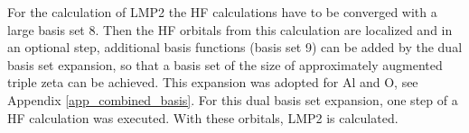 \documentclass[11pt,DIV=13,BCOR=5mm,a4paper,headinclude]{scrbook}
\begin{document}
For the calculation of LMP2 the HF calculations have to be converged with a large basis set 8.
Then the HF orbitals from this calculation are localized and in an optional step, additional basis functions (basis set 9) can be added by the dual basis set expansion\cite{Usvyat2010}, so that a basis set of the size of approximately augmented triple zeta can be achieved.
This expansion was adopted for Al and O, see Appendix \ref{app_combined_basis}.
For this dual basis set expansion, one step of a HF calculation was executed.
With these orbitals, LMP2 is calculated.
\end{document}
